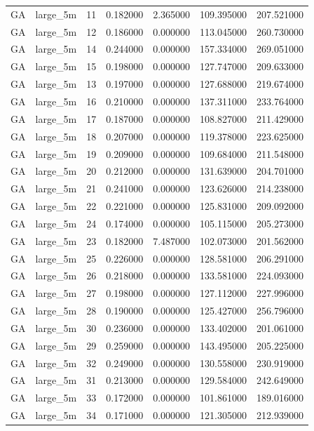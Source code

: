 \begin{tabular}{llrrrrr}
GA & large_5m & 11 & 0.182000 & 2.365000 & 109.395000 & 207.521000 \\
GA & large_5m & 12 & 0.186000 & 0.000000 & 113.045000 & 260.730000 \\
GA & large_5m & 14 & 0.244000 & 0.000000 & 157.334000 & 269.051000 \\
GA & large_5m & 15 & 0.198000 & 0.000000 & 127.747000 & 209.633000 \\
GA & large_5m & 13 & 0.197000 & 0.000000 & 127.688000 & 219.674000 \\
GA & large_5m & 16 & 0.210000 & 0.000000 & 137.311000 & 233.764000 \\
GA & large_5m & 17 & 0.187000 & 0.000000 & 108.827000 & 211.429000 \\
GA & large_5m & 18 & 0.207000 & 0.000000 & 119.378000 & 223.625000 \\
GA & large_5m & 19 & 0.209000 & 0.000000 & 109.684000 & 211.548000 \\
GA & large_5m & 20 & 0.212000 & 0.000000 & 131.639000 & 204.701000 \\
GA & large_5m & 21 & 0.241000 & 0.000000 & 123.626000 & 214.238000 \\
GA & large_5m & 22 & 0.221000 & 0.000000 & 125.831000 & 209.092000 \\
GA & large_5m & 24 & 0.174000 & 0.000000 & 105.115000 & 205.273000 \\
GA & large_5m & 23 & 0.182000 & 7.487000 & 102.073000 & 201.562000 \\
GA & large_5m & 25 & 0.226000 & 0.000000 & 128.581000 & 206.291000 \\
GA & large_5m & 26 & 0.218000 & 0.000000 & 133.581000 & 224.093000 \\
GA & large_5m & 27 & 0.198000 & 0.000000 & 127.112000 & 227.996000 \\
GA & large_5m & 28 & 0.190000 & 0.000000 & 125.427000 & 256.796000 \\
GA & large_5m & 30 & 0.236000 & 0.000000 & 133.402000 & 201.061000 \\
GA & large_5m & 29 & 0.259000 & 0.000000 & 143.495000 & 205.225000 \\
GA & large_5m & 32 & 0.249000 & 0.000000 & 130.558000 & 230.919000 \\
GA & large_5m & 31 & 0.213000 & 0.000000 & 129.584000 & 242.649000 \\
GA & large_5m & 33 & 0.172000 & 0.000000 & 101.861000 & 189.016000 \\
GA & large_5m & 34 & 0.171000 & 0.000000 & 121.305000 & 212.939000 \\

\end{tabular}
